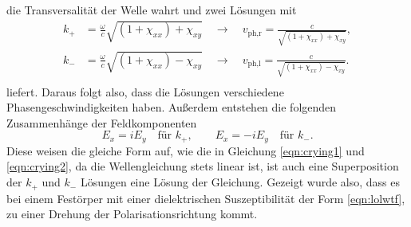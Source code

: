 die Transversalität der Welle wahrt und zwei Lösungen mit
\begin{align*}
    k_+ &= \frac{\omega}{c} \sqrt{(1+\chi_{xx})+ \chi_{xy}} \quad \to \quad v_{\text{ph,r}} = \frac{c}{\sqrt{(1+\chi_{xx})+ \chi_{xy}}}, \\
    k_- &= \frac{\omega}{c} \sqrt{(1+\chi_{xx})- \chi_{xy}} \quad \to \quad v_{\text{ph,l}} = \frac{c}{\sqrt{(1+\chi_{xx})- \chi_{xy}}}.\\
\end{align*}
liefert. Daraus folgt also, dass die Lösungen verschiedene Phasengeschwindigkeiten haben.
Außerdem entstehen die folgenden Zusammenhänge der Feldkomponenten
\begin{equation*}
    E_x = i E_y \quad \text{für } k_+{,} \quad \quad E_x = -i E_y \quad \text{für } k_-{.}
\end{equation*}
Diese weisen die gleiche Form auf, wie die in Gleichung \eqref{eqn:crying1} und \eqref{eqn:crying2}, da die Wellengleichung stets linear ist, ist auch eine Superposition der $k_+$ und $k_-$ Lösungen 
eine Lösung der Gleichung. Gezeigt wurde also, dass es bei einem Festörper mit einer dielektrischen Suszeptibilität der Form \eqref{eqn:lolwtf}, zu einer Drehung der Polarisationsrichtung
kommt.

